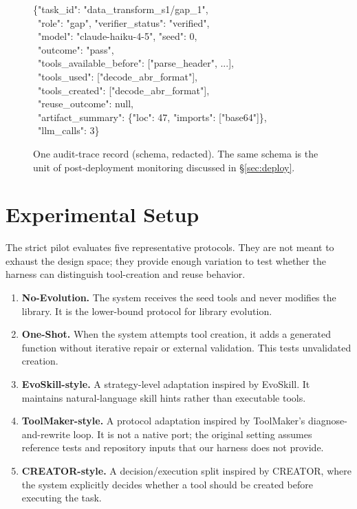 \documentclass[sigconf,anonymous,review,natbib=false]{acmart}
\begin{document}
\begin{figure}[t]
\small
\begin{tcolorbox}[colframe=black!70, colback=gray!5, boxrule=0.5pt, fontupper=\ttfamily\footnotesize]
\{"task\_id": "data\_transform\_s1/gap\_1",\\
~"role": "gap", "verifier\_status": "verified",\\
~"model": "claude-haiku-4-5", "seed": 0,\\
~"outcome": "pass",\\
~"tools\_available\_before": ["parse\_header", ...],\\
~"tools\_used": ["decode\_abr\_format"],\\
~"tools\_created": ["decode\_abr\_format"],\\
~"reuse\_outcome": null,\\
~"artifact\_summary": \{"loc": 47, "imports": ["base64"]\},\\
~"llm\_calls": 3\}
\end{tcolorbox}
\caption{One audit-trace record (schema, redacted). The same schema is the unit of post-deployment monitoring discussed in \S\ref{sec:deploy}.}
\label{fig:trace-schema}
\end{figure}

\section{Experimental Setup}

The strict pilot evaluates five representative protocols. They are not meant to exhaust the design space; they provide enough variation to test whether the harness can distinguish tool-creation and reuse behavior.

\begin{enumerate}[leftmargin=1.2em]
  \item \textbf{No-Evolution.} The system receives the seed tools and never modifies the library. It is the lower-bound protocol for library evolution.
  \item \textbf{One-Shot.} When the system attempts tool creation, it adds a generated function without iterative repair or external validation. This tests unvalidated creation.
  \item \textbf{EvoSkill-style.} A strategy-level adaptation inspired by EvoSkill. It maintains natural-language skill hints rather than executable tools.
  \item \textbf{ToolMaker-style.} A protocol adaptation inspired by ToolMaker's diagnose-and-rewrite loop. It is not a native port; the original setting assumes reference tests and repository inputs that our harness does not provide.
  \item \textbf{CREATOR-style.} A decision/execution split inspired by CREATOR, where the system explicitly decides whether a tool should be created before executing the task.
\end{enumerate}
\end{document}
